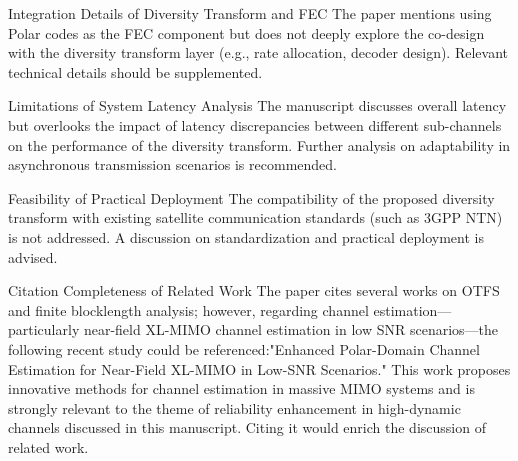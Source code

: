 Integration Details of Diversity Transform and FEC
   The paper mentions using Polar codes as the FEC component but does not deeply explore the co-design with the diversity transform layer (e.g., rate allocation, decoder design). Relevant technical details should be supplemented.

Limitations of System Latency Analysis
   The manuscript discusses overall latency but overlooks the impact of latency discrepancies between different sub-channels on the performance of the diversity transform. Further analysis on adaptability in asynchronous transmission scenarios is recommended.

Feasibility of Practical Deployment
   The compatibility of the proposed diversity transform with existing satellite communication standards (such as 3GPP NTN) is not addressed. A discussion on standardization and practical deployment is advised.

Citation Completeness of Related Work
   The paper cites several works on OTFS and finite blocklength analysis; however, regarding channel estimation—particularly near-field XL-MIMO channel estimation in low SNR scenarios—the following recent study could be referenced:"Enhanced Polar-Domain Channel Estimation for Near-Field XL-MIMO in Low-SNR Scenarios." This work proposes innovative methods for channel estimation in massive MIMO systems and is strongly relevant to the theme of reliability enhancement in high-dynamic channels discussed in this manuscript. Citing it would enrich the discussion of related work. 
